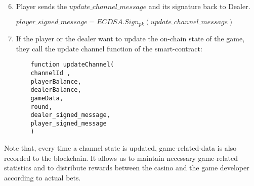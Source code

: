\begin{algorithm}
\begin{enumerate}
\setcounter{enumi}{5}
\item Player sends the $update\_channel\_message$ and its signature back to Dealer. 
\begin{center}
 $player\_signed\_message = ECDSA.Sign_{pk}(update\_channel\_message)$
\end{center}
 \item If the player or the dealer want to update the on-chain state of the game, they call the update channel function of the smart-contract:
\begin{lstlisting}
    function updateChannel(
	channelId ,
	playerBalance,
	dealerBalance,
	gameData,
	round,
	dealer_signed_message,
	player_signed_message
    )
\end{lstlisting}
\end{enumerate}
\end{algorithm}

Note that, every time a channel state is updated, game-related-data is also recorded to the blockchain. It allows us to maintain necessary game-related statistics and to distribute rewards between the casino and the game developer according to actual bets.

